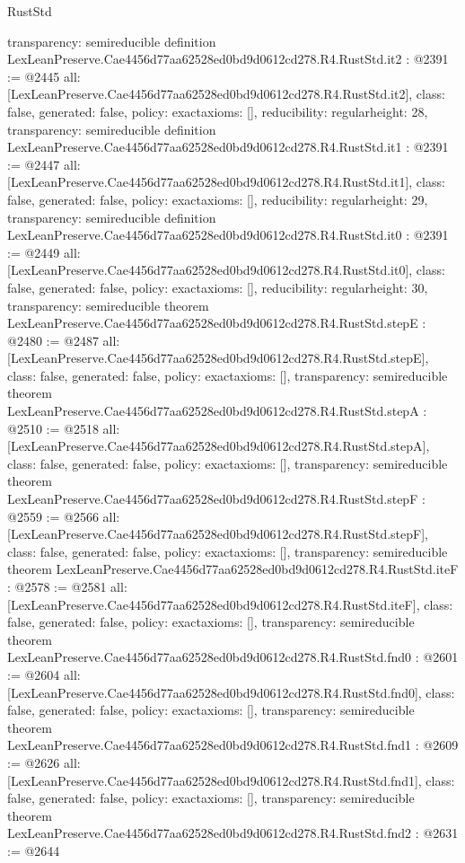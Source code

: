 \begin{lexlean}{RustStd}
\begin{coremodule}
{  transparency: semireducible
}
definition LexLeanPreserve.Cae4456d77aa62528ed0bd9d0612cd278.R4.RustStd.it2 : @2391 := @2445 {
  all: [LexLeanPreserve.Cae4456d77aa62528ed0bd9d0612cd278.R4.RustStd.it2],
  class: false,
  generated: false,
  policy: exact{axioms: []},
  reducibility: regular{height: 28},
  transparency: semireducible
}
definition LexLeanPreserve.Cae4456d77aa62528ed0bd9d0612cd278.R4.RustStd.it1 : @2391 := @2447 {
  all: [LexLeanPreserve.Cae4456d77aa62528ed0bd9d0612cd278.R4.RustStd.it1],
  class: false,
  generated: false,
  policy: exact{axioms: []},
  reducibility: regular{height: 29},
  transparency: semireducible
}
definition LexLeanPreserve.Cae4456d77aa62528ed0bd9d0612cd278.R4.RustStd.it0 : @2391 := @2449 {
  all: [LexLeanPreserve.Cae4456d77aa62528ed0bd9d0612cd278.R4.RustStd.it0],
  class: false,
  generated: false,
  policy: exact{axioms: []},
  reducibility: regular{height: 30},
  transparency: semireducible
}
theorem LexLeanPreserve.Cae4456d77aa62528ed0bd9d0612cd278.R4.RustStd.stepE : @2480 := @2487 {
  all: [LexLeanPreserve.Cae4456d77aa62528ed0bd9d0612cd278.R4.RustStd.stepE],
  class: false,
  generated: false,
  policy: exact{axioms: []},
  transparency: semireducible
}
theorem LexLeanPreserve.Cae4456d77aa62528ed0bd9d0612cd278.R4.RustStd.stepA : @2510 := @2518 {
  all: [LexLeanPreserve.Cae4456d77aa62528ed0bd9d0612cd278.R4.RustStd.stepA],
  class: false,
  generated: false,
  policy: exact{axioms: []},
  transparency: semireducible
}
theorem LexLeanPreserve.Cae4456d77aa62528ed0bd9d0612cd278.R4.RustStd.stepF : @2559 := @2566 {
  all: [LexLeanPreserve.Cae4456d77aa62528ed0bd9d0612cd278.R4.RustStd.stepF],
  class: false,
  generated: false,
  policy: exact{axioms: []},
  transparency: semireducible
}
theorem LexLeanPreserve.Cae4456d77aa62528ed0bd9d0612cd278.R4.RustStd.iteF : @2578 := @2581 {
  all: [LexLeanPreserve.Cae4456d77aa62528ed0bd9d0612cd278.R4.RustStd.iteF],
  class: false,
  generated: false,
  policy: exact{axioms: []},
  transparency: semireducible
}
theorem LexLeanPreserve.Cae4456d77aa62528ed0bd9d0612cd278.R4.RustStd.fnd0 : @2601 := @2604 {
  all: [LexLeanPreserve.Cae4456d77aa62528ed0bd9d0612cd278.R4.RustStd.fnd0],
  class: false,
  generated: false,
  policy: exact{axioms: []},
  transparency: semireducible
}
theorem LexLeanPreserve.Cae4456d77aa62528ed0bd9d0612cd278.R4.RustStd.fnd1 : @2609 := @2626 {
  all: [LexLeanPreserve.Cae4456d77aa62528ed0bd9d0612cd278.R4.RustStd.fnd1],
  class: false,
  generated: false,
  policy: exact{axioms: []},
  transparency: semireducible
}
theorem LexLeanPreserve.Cae4456d77aa62528ed0bd9d0612cd278.R4.RustStd.fnd2 : @2631 := @2644 {
}
\end{coremodule}
\end{lexlean}
